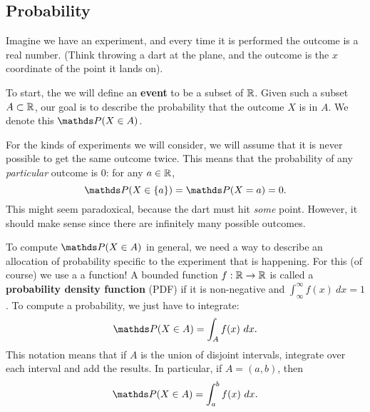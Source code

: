 \subsection{Probability}

Imagine we have an experiment, and every time it is performed the outcome is a real number. (Think throwing a dart at the plane, and the outcome is the $x$ coordinate of the point it lands on). 

To start, the we will define an \textbf{event} to be a subset of $\mathbb{R}$. Given such a subset $A\subset\mathbb{R}$, our goal is to describe the probability that the outcome $X$ is in $A$. We denote this $\P(X\in A)$.


For the kinds of experiments we will consider, we will assume that it is never possible to get the same outcome twice. This means that the probability of any \textit{particular} outcome is 0: for any $a\in\mathbb{R}$, $$\P(X\in\{a\})=\P(X=a)=0.$$ 
This might seem paradoxical, because the dart must hit \textit{some} point. However, it should make sense since there are infinitely many possible outcomes.

To compute $\P(X\in A)$ in general, we need a way to describe an allocation of probability specific to the experiment that is happening. For this (of course) we use a a function! A bounded function $f:\mathbb{R} \to \mathbb{R}$ is called a \textbf{probability density function} (PDF) if it is non-negative and $\int_{\infty}^\infty f(x)\ dx= 1$. 
To compute a probability, we just have to integrate:
$$\P(X\in A) = \int_A f(x)\ dx.$$
This notation means that if $A$ is the union of disjoint intervals, integrate over each interval and add the results. In particular, if $A=(a,b)$, then 
$$\P(X\in A) = \int_a^b f(x)\ dx.$$

